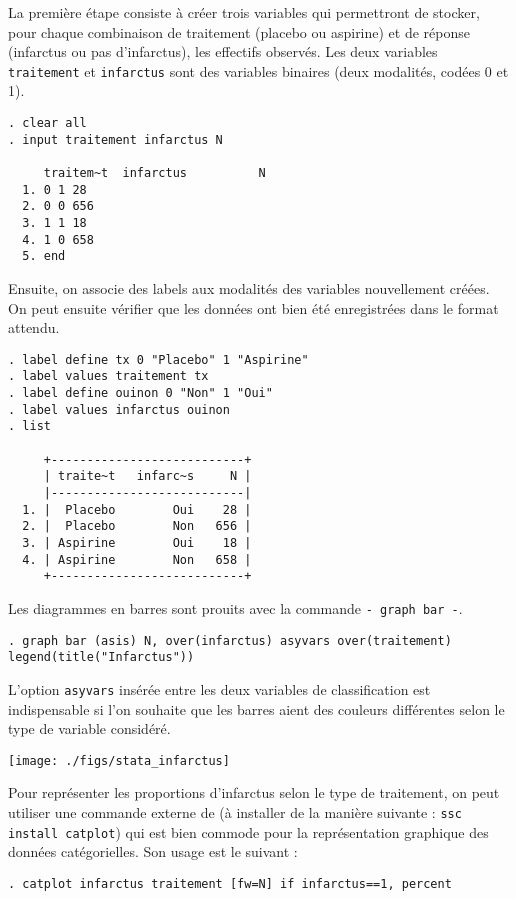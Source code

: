 La première étape consiste à créer trois variables qui permettront de
stocker, pour chaque combinaison de traitement (placebo ou aspirine) et de
réponse (infarctus ou pas d'infarctus), les effectifs observés. Les deux
variables \texttt{traitement} et \texttt{infarctus} sont des variables
binaires (deux modalités, codées 0 et 1). 
\begin{verbatim}
. clear all
. input traitement infarctus N

     traitem~t  infarctus          N
  1. 0 1 28
  2. 0 0 656
  3. 1 1 18
  4. 1 0 658
  5. end
\end{verbatim}
Ensuite, on associe des labels aux modalités des variables nouvellement
créées. On peut ensuite vérifier que les données ont bien été enregistrées
dans le format attendu.
\begin{verbatim}
. label define tx 0 "Placebo" 1 "Aspirine"
. label values traitement tx
. label define ouinon 0 "Non" 1 "Oui"
. label values infarctus ouinon
. list

     +---------------------------+
     | traite~t   infarc~s     N |
     |---------------------------|
  1. |  Placebo        Oui    28 |
  2. |  Placebo        Non   656 |
  3. | Aspirine        Oui    18 |
  4. | Aspirine        Non   658 |
     +---------------------------+
\end{verbatim}

Les diagrammes en barres sont prouits avec la commande \verb|- graph bar -|.
\begin{verbatim}
. graph bar (asis) N, over(infarctus) asyvars over(traitement) legend(title("Infarctus"))
\end{verbatim}
L'option \texttt{asyvars} insérée entre les deux variables de classification
est indispensable si l'on souhaite que les barres aient des couleurs
différentes selon le type de variable considéré.

\texttt{[image: ./figs/stata\_infarctus]}

Pour représenter les proportions d'infarctus selon le type de traitement, on
peut utiliser une commande externe de \Stata (à installer de la manière
suivante : \verb|ssc install catplot|) qui est bien commode pour la
représentation graphique des données catégorielles. Son usage est le suivant :
\begin{verbatim}
. catplot infarctus traitement [fw=N] if infarctus==1, percent
\end{verbatim}

